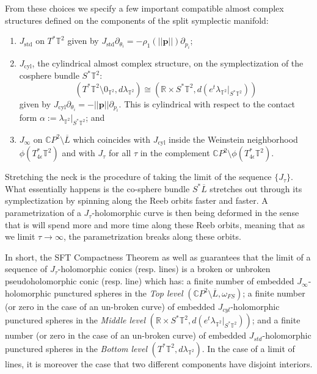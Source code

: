 \documentclass[10pt]{amsart}
\theoremstyle{plain}
\theoremstyle{definition}
\numberwithin{equation}{section}
\newcommand{\R}{\mathbb{R}}
\newcommand{\C}{\mathbb{C}}
\newcommand{\sm}{\setminus}
\begin{document}
From these choices we specify a few important compatible almost complex structures defined on the components of the split symplectic manifold:
    \begin{enumerate}
    \item $J_{\text{std}}$ on $T^*\mathbb{T}^2$ given by $J_{\text{std}} \partial_{\theta_i} = -\rho_1(||\textbf{p}||)\partial_{p_i}$;
    
    \item $J_{\text{cyl}}$, the cylindrical almost complex structure, on the symplectization of the cosphere bundle $S^*\mathbb{T}^2$:
    $$(T^*\mathbb{T}^2 \sm 0_{\mathbb{T}^2}, d\lambda_{\mathbb{T}^2}) \cong (\R \times S^*\mathbb{T}^2, d(e^t\lambda_{\mathbb{T}^2}|_{S^*\mathbb{T}^2}))$$
    given by $J_{\text{cyl}} \partial_{\theta_i} = -||\textbf{p}||\partial_{p_i}$. This is cylindrical with respect to the contact form $\alpha := \lambda_{\mathbb{T}^2}|_{S^*\mathbb{T}^2}$; and
    
    \item $J_\infty$ on $\C P^2 \sm \overline{L}$ which coincides with $J_\text{cyl}$ inside the Weinstein neighborhood $\phi(T^*_{4\epsilon}\mathbb{T}^2)$ and with $J_\tau$ for all $\tau$ in the complement $\C P^2 \sm \phi(T^*_{4\epsilon}\mathbb{T}^2)$.
    \end{enumerate}

Stretching the neck is the procedure of taking the limit of the sequence $\{ J_\tau \}$. What essentially happens is the co-sphere bundle $S^*\overline{L}$ stretches out through its symplectization by spinning along the Reeb orbits faster and faster. A parametrization of a $J_\tau$-holomorphic curve is then being deformed in the sense that is will spend more and more time along these Reeb orbits, meaning that as we limit $\tau\to \infty$, the parametrization breaks along these orbits. 

In short, the SFT Compactness Theorem \cite{Bourgeois03_SFT} as well as \cite[Lemma 5.2]{DR19_WhitneySphere} guarantees that the limit of a sequence of $J_\tau$-holomorphic conics (resp. lines) is a broken or unbroken pseudoholomorphic conic (resp. line) which has: a finite number of embedded $J_\infty$-holomorphic punctured spheres in the \textit{Top level} $(\C P^2\sm \overline{L},\omega_{FS})$; a finite number (or zero in the case of an un-broken curve) of embedded $J_{cyl}$-holomorphic punctured spheres in the \textit{Middle level} $(\R \times S^*\mathbb{T}^2, d(e^t\lambda_{\mathbb{T}^2}|_{S^*\mathbb{T}^2}))$; and a finite number (or zero in the case of an un-broken curve) of embedded $J_{std}$-holomorphic punctured spheres in the \textit{Bottom level} $(T^*\mathbb{T}^2,d\lambda_{\mathbb{T}^2})$. In the case of a limit of lines, it is moreover the case that two different components have disjoint interiors.
\end{document}
